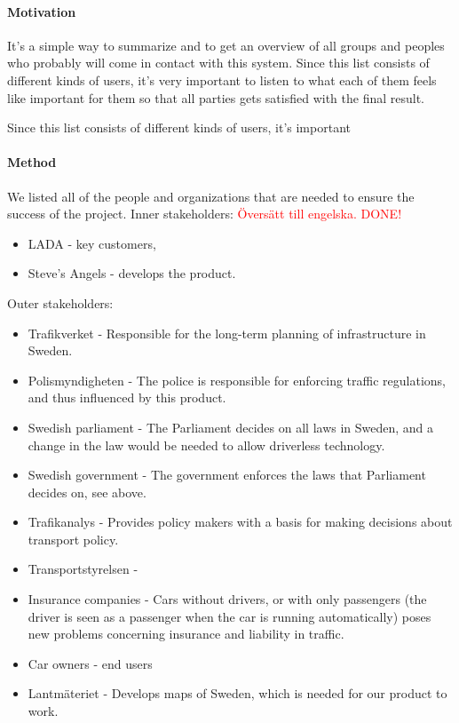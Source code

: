 \documentclass[10pt]{article}
\newcommand\todo[1]{\textcolor{red}{#1}}
\begin{document}
\paragraph{Motivation}
\hfill \break
It’s a simple way to summarize and to get an overview of all groups and peoples who probably will come in contact with this system. Since this list consists of different kinds of users, it's very important to listen to what each of them feels like important for them so that all parties gets satisfied with the final result.

Since this list consists of different kinds of users, it's important 
\paragraph{Method}
\hfill \break
We listed all of the people and organizations that are needed to ensure the success of the project. 
Inner stakeholders:
\todo{Översätt till engelska. DONE!}
\begin{itemize}
\item LADA - key customers, 
\item Steve's Angels - develops the product. 
\end{itemize}

Outer stakeholders:
\begin{itemize}
\item Trafikverket - Responsible for the long-term planning of infrastructure in Sweden.
\item Polismyndigheten - The police is responsible for enforcing traffic regulations, and thus influenced by this product.
\item Swedish parliament - The Parliament decides on all laws in Sweden, and a change in the law would be needed to allow driverless technology.
\item Swedish government - The government enforces the laws that Parliament decides on, see above.
\item Trafikanalys - Provides policy makers with a basis for making decisions about transport policy.
\item Transportstyrelsen - 
\item Insurance companies - Cars without drivers, or with only passengers (the driver is seen as a passenger when the car is running automatically) poses new problems concerning insurance and liability in traffic.
\item Car owners - end users
\item Lantmäteriet - Develops maps of Sweden, which is needed for our product to work.
\end{itemize}
\end{document}
